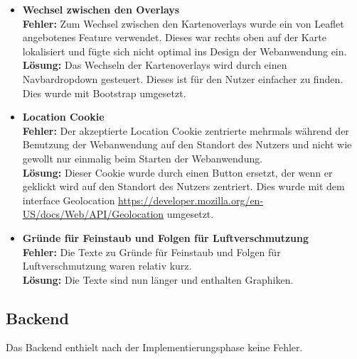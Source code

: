 \begin{itemize}
	\item \textbf{Wechsel zwischen den Overlays}
	\\
	\textbf{Fehler:} Zum Wechsel zwischen den \glspl{Kartenoverlay} wurde ein von \gls{Leaflet} angebotenes Feature verwendet. Dieses war rechts oben auf der Karte lokalisiert und fügte sich nicht optimal ins Design der Webanwendung ein.
	\\
	\textbf{Lösung:} Das Wechseln der \glspl{Kartenoverlay} wird durch einen Navbardropdown gesteuert. Dieses ist für den Nutzer einfacher zu finden. Dies wurde mit \gls{Bootstrap} umgesetzt.
	\item \textbf{Location Cookie}
	\\
	\textbf{Fehler:} Der akzeptierte Location Cookie zentrierte mehrmals während der Benutzung der Webanwendung auf den Standort des Nutzers und nicht wie gewollt nur einmalig beim Starten der Webanwendung.
	\\
	\textbf{Lösung:} Dieser Cookie wurde durch einen Button ersetzt, der wenn er geklickt wird auf den Standort des Nutzers zentriert. Dies wurde mit dem interface Geolocation \url{https://developer.mozilla.org/en-US/docs/Web/API/Geolocation} umgesetzt.
	\item \textbf{Gründe für Feinstaub und Folgen für Luftverschmutzung}
	\\
	\textbf{Fehler:} Die Texte zu Gr\"unde f\"ur Feinstaub und Folgen für Luftverschmutzung waren relativ kurz.
	\\
	\textbf{Lösung:} Die Texte sind nun länger und enthalten Graphiken.	
\end{itemize}
\subsection{Backend}
Das Backend enthielt nach der Implementierungsphase keine Fehler.
